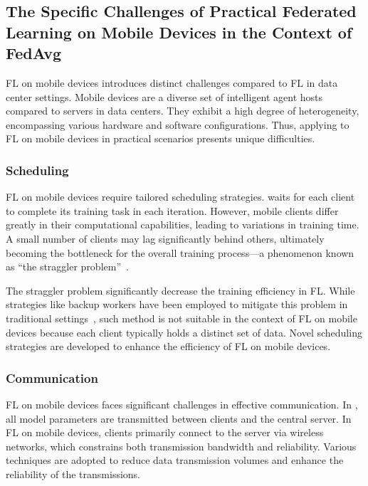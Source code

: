 \documentclass[conference]{IEEEtran}
\begin{document}
\subsection{The Specific Challenges of Practical Federated Learning on
Mobile Devices in the Context of FedAvg}

FL on mobile devices introduces distinct challenges compared to
FL in data center settings.
Mobile devices are a diverse set of intelligent agent hosts compared to
servers in data centers.
They exhibit a high degree of heterogeneity,
encompassing various hardware and software configurations.
Thus, applying \FedAvg{} to FL on mobile devices in practical scenarios
presents unique difficulties.

\subsubsection{Scheduling}

FL on mobile devices require tailored scheduling strategies.
\FedAvg{} waits for each client to complete its training task in
each iteration.
However, mobile clients differ greatly in their computational capabilities,
leading to variations in training time.
A small number of clients may lag significantly behind others,
ultimately becoming the bottleneck for the overall training process—a
phenomenon known as
``the straggler problem''~\cite{chen2020asynchronous,zheng2017asynchronous}.

The straggler problem significantly decrease the training efficiency in FL.
While strategies like backup workers have been employed to
mitigate this problem in traditional settings~\cite{chen2016revisiting},
such method is not suitable in the context of FL on mobile devices because
each client typically holds a distinct set of data.
Novel scheduling strategies are developed to
enhance the efficiency of FL on mobile devices.

\subsubsection{Communication}

FL on mobile devices faces significant challenges in effective communication.
In \FedAvg{}, all model parameters are transmitted between
clients and the central server.
In FL on mobile devices,
clients primarily connect to the server via wireless networks,
which constrains both transmission bandwidth and reliability.
Various techniques are adopted to reduce data transmission volumes
and enhance the reliability of the transmissions.
\end{document}
